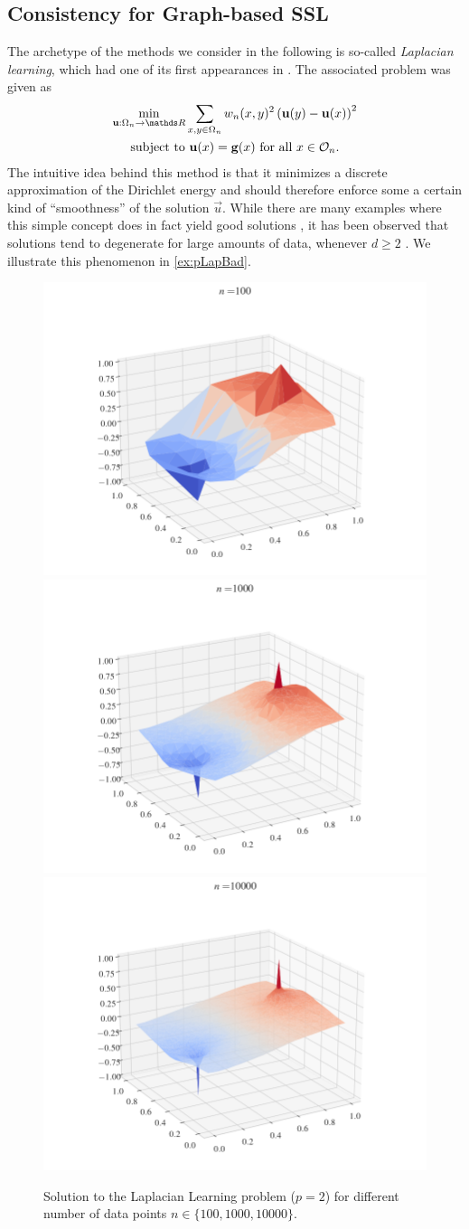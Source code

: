 \subsection{Consistency for Graph-based SSL}\label{sec:CSSL}
%
The archetype of the methods we consider in the following is so-called \emph{Laplacian learning}, which had one of its first appearances in 
\cite{zhu2003semi}. The associated problem was given as
%
\begin{gather}\label{eq:SSL_Laplacian}
\begin{gathered}
\min_{\vec u:\domain_n\to\R} \sum_{x,y\in\domain_n} w_n(x,y)^2 
\left(\vec u(y) - \vec u(x) \right)^2\\
\text{subject to } \vec u(x) = \vec g(x) \text{ for all } x\in\conset_n.
\end{gathered}
\end{gather}
%
%
%
The intuitive idea behind this method is that it minimizes a discrete approximation of the Dirichlet energy and should therefore enforce some a certain kind of \enquote{smoothness} of the solution $\vec u$. While there are many examples where this simple concept does in fact yield good solutions \cite{}, it has been observed that solutions tend to degenerate for large amounts of data, whenever $d\geq 2$ \cite{nadler2009statistical, alamgir2011phase, el2016asymptotic}. We illustrate this phenomenon in \cref{ex:pLapBad}.
%
\begin{figure}
\includegraphics[width=.28\textwidth, trim={3.1cm 1cm 3.5cm 0cm},clip]{code/SSL/2Dex_100.png}%
\hfill%
\includegraphics[width=.28\textwidth,trim={3.1cm 1cm 3.5cm 0cm},clip]{code/SSL/2Dex_1000.png}%
\hfill%
\includegraphics[width=.28\textwidth,trim={3.1cm 1cm 3.5cm 0cm},clip]{code/SSL/2Dex_10000.png}%
%
\caption{Solution to the Laplacian Learning problem ($p=2$) for different number of data points $n\in\{100,1000,10000\}$.}\label{fig:pdeg}
\end{figure}
